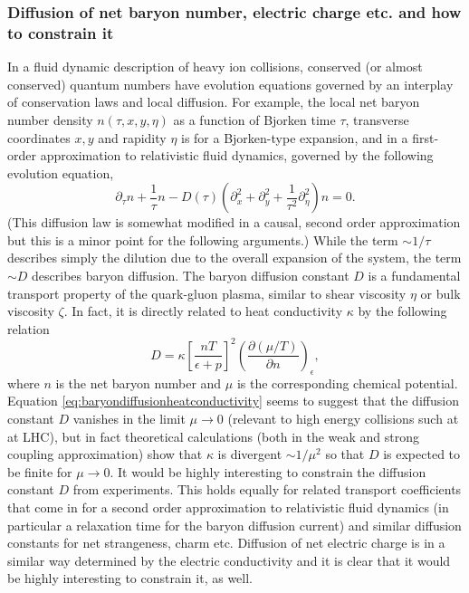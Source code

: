 \subsubsection{Diffusion of net baryon number, electric charge etc. and how to constrain it}
In a fluid dynamic description of heavy ion collisions, conserved (or almost conserved) quantum numbers have evolution equations governed by an interplay of conservation laws and local diffusion. For example, the local net baryon number density $n(\tau, x, y, \eta)$ as a function of Bjorken time $\tau$, transverse coordinates $x,y$ and rapidity $\eta$ is for a Bjorken-type expansion, and in a first-order approximation to relativistic fluid dynamics, governed by the following evolution equation,
\begin{equation}
\partial_\tau n + \frac{1}{\tau}n - D(\tau) \left( \partial_x^2 + \partial_y^2 + \frac{1}{\tau^2} \partial_\eta^2 \right) n =0.
\end{equation}
(This diffusion law is somewhat modified in a causal, second order approximation but this is a minor point for the following arguments.) While the term $\sim 1/ \tau$ describes simply the dilution due to the overall expansion of the system, the term $\sim D$ describes baryon diffusion. The baryon diffusion constant $D$ is a fundamental transport property of the quark-gluon plasma, similar to shear viscosity $\eta$ or bulk viscosity $\zeta$. In fact, it is directly related to heat conductivity $\kappa$ by the following relation
\begin{equation}
D = \kappa \left[ \frac{nT}{\epsilon + p} \right]^2 \left( \frac{\partial (\mu/T)}{\partial n} \right)_\epsilon,
\label{eq:baryondiffusionheatconductivity}
\end{equation}
where $n$ is the net baryon number and $\mu$ is the corresponding chemical potential. Equation \eqref{eq:baryondiffusionheatconductivity} seems to suggest that the diffusion constant $D$ vanishes in the limit $\mu\to 0$ (relevant to high energy collisions such at at LHC), but in fact theoretical calculations (both in the weak and strong coupling approximation) show that $\kappa$ is divergent $\sim 1/\mu^2$ so that $D$ is expected to be finite for $\mu\to 0$. It would be highly interesting to constrain the diffusion constant $D$ from experiments. This holds equally for related transport coefficients that come in for a second order approximation to relativistic fluid dynamics (in particular a relaxation time for the baryon diffusion current) and similar diffusion constants for net strangeness, charm etc. Diffusion of net electric charge is in a similar way determined by the electric conductivity and it is clear that it would be highly interesting to constrain it, as well.

